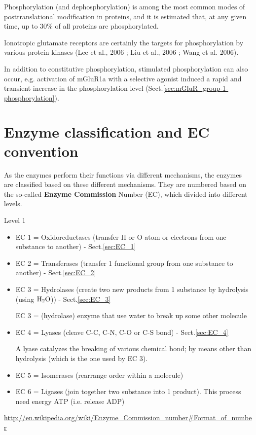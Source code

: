 \begin{mdframed}
Phosphorylation (and dephosphorylation) is among the most common modes of
posttranslational modification in proteins, and it is estimated that, at any
given time, up to 30\% of all proteins are phosphorylated.
\end{mdframed}


Ionotropic glutamate receptors are certainly the targets for phosphorylation by
various protein kinases (Lee et al., 2006 ; Liu et al., 2006 ; Wang et al.
2006).

In addition to constitutive phosphorylation, stimulated phosphorylation can
also occur, e.g.  activation of mGluR1a with a selective agonist induced a rapid
and transient increase in the phosphorylation level
(Sect.\ref{sec:mGluR_group-1-phosphorylation}).




\section{Enzyme classification and EC convention}
\label{sec:enzyme-mechanism}
\label{sec:EC_convention}
\label{sec:enzyme-classification}

As the enzymes perform their functions via different mechanisms, the enzymes are
classified based on these different mechanisms. They are numbered based on the
so-called {\bf Enzyme Commission} Number (EC), which divided into different
levels.

Level 1
\begin{itemize}
  \item EC 1 = Oxidoreductases (transfer H or O atom or electrons from one
  substance to another) - Sect.\ref{sec:EC_1}
  
  \item EC 2 = Transferases (transfer 1 functional group from one substance to
  another) - Sect.\ref{sec:EC_2}
  
  
  \item EC 3 = Hydrolases (create two new products from 1 substance
  by hydrolysis (using $\ce{H2O}$)) - Sect.\ref{sec:EC_3}
  

EC 3 = (hydrolase) enzyme that use water to break up some
    other molecule
  
  \item EC 4 = Lyases (cleave C-C, C-N, C-O or C-S bond) - Sect.\ref{sec:EC_4}
  
A lyase  catalyzes the breaking of various chemical bond; by means other than
hydrolysis (which is the one used by EC 3).


  
  \item EC 5 = Isomerases  (rearrange order within a molecule)
  
  \item EC 6 = Ligases (join together two substance into 1 product).
  This process need energy ATP (i.e. release ADP)
  
\end{itemize}
\url{http://en.wikipedia.org/wiki/Enzyme_Commission_number#Format_of_number}

